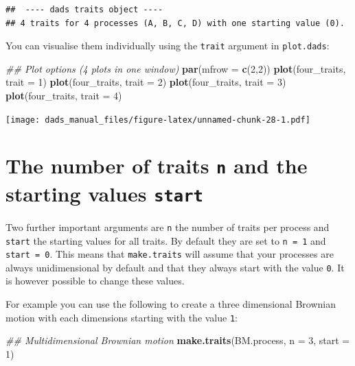 \documentclass[]{book}
\newenvironment{Shaded}{\begin{snugshade}}{\end{snugshade}}
\newcommand{\CommentTok}[1]{\textcolor[rgb]{0.56,0.35,0.01}{\textit{#1}}}
\newcommand{\DataTypeTok}[1]{\textcolor[rgb]{0.13,0.29,0.53}{#1}}
\newcommand{\DecValTok}[1]{\textcolor[rgb]{0.00,0.00,0.81}{#1}}
\newcommand{\KeywordTok}[1]{\textcolor[rgb]{0.13,0.29,0.53}{\textbf{#1}}}
\newcommand{\NormalTok}[1]{#1}
\begin{document}
\begin{verbatim}
##  ---- dads traits object ---- 
## 4 traits for 4 processes (A, B, C, D) with one starting value (0).
\end{verbatim}

You can visualise them individually using the \texttt{trait} argument in \texttt{plot.dads}:

\begin{Shaded}
\begin{Highlighting}[]
\CommentTok{## Plot options (4 plots in one window)}
\KeywordTok{par}\NormalTok{(}\DataTypeTok{mfrow =} \KeywordTok{c}\NormalTok{(}\DecValTok{2}\NormalTok{,}\DecValTok{2}\NormalTok{))}
\KeywordTok{plot}\NormalTok{(four_traits, }\DataTypeTok{trait =} \DecValTok{1}\NormalTok{)}
\KeywordTok{plot}\NormalTok{(four_traits, }\DataTypeTok{trait =} \DecValTok{2}\NormalTok{)}
\KeywordTok{plot}\NormalTok{(four_traits, }\DataTypeTok{trait =} \DecValTok{3}\NormalTok{)}
\KeywordTok{plot}\NormalTok{(four_traits, }\DataTypeTok{trait =} \DecValTok{4}\NormalTok{)}
\end{Highlighting}
\end{Shaded}

\texttt{[image: dads\_manual\_files/figure-latex/unnamed-chunk-28-1.pdf]}

\hypertarget{the-number-of-traits-n-and-the-starting-values-start}{%
\section{\texorpdfstring{The number of traits \texttt{n} and the starting values \texttt{start}}{The number of traits n and the starting values start}}\label{the-number-of-traits-n-and-the-starting-values-start}}

Two further important arguments are \texttt{n} the number of traits per process and \texttt{start} the starting values for all traits.
By default they are set to \texttt{n\ =\ 1} and \texttt{start\ =\ 0}.
This means that \texttt{make.traits} will assume that your processes are always unidimensional by default and that they always start with the value \texttt{0}.
It is however possible to change these values.

For example you can use the following to create a three dimensional Brownian motion with each dimensions starting with the value \texttt{1}:

\begin{Shaded}
\begin{Highlighting}[]
\CommentTok{## Multidimensional Brownian motion}
\KeywordTok{make.traits}\NormalTok{(BM.process, }\DataTypeTok{n =} \DecValTok{3}\NormalTok{, }\DataTypeTok{start =} \DecValTok{1}\NormalTok{)}
\end{Highlighting}
\end{Shaded}
\end{document}
